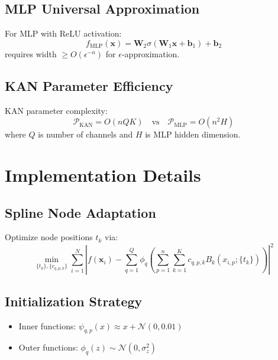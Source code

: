 \documentclass[12pt]{article}
\theoremstyle{plain}
\theoremstyle{definition}
\begin{document}
\subsection{MLP Universal Approximation}
For MLP with ReLU activation:
$$
f_{\text{MLP}}(\mathbf{x}) = \mathbf{W}_2 \sigma(\mathbf{W}_1\mathbf{x} + \mathbf{b}_1) + \mathbf{b}_2
$$
requires width $ \geq O(\epsilon^{-n}) $ for $ \epsilon $-approximation.

\subsection{KAN Parameter Efficiency}
KAN parameter complexity:
$$
\mathcal{P}_{\text{KAN}} = O(nQK) \quad \text{vs} \quad \mathcal{P}_{\text{MLP}} = O(n^2H)
$$
where $ Q $ is number of channels and $ H $ is MLP hidden dimension.

\section{Implementation Details}

\subsection{Spline Node Adaptation}
Optimize node positions $ t_k $ via:
$$
\min_{\{t_k\},\{c_{q,p,k}\}} \sum_{i=1}^N \left| f(\mathbf{x}_i) - \sum_{q=1}^Q \phi_q\left( \sum_{p=1}^n \sum_{k=1}^K c_{q,p,k} B_k(x_{i,p}; \{t_k\}) \right) \right|^2
$$

\subsection{Initialization Strategy}
\begin{itemize}
    \item Inner functions: $ \psi_{q,p}(x) \approx x + \mathcal{N}(0,0.01) $
    \item Outer functions: $ \phi_q(z) \sim \mathcal{N}(0,\sigma_z^2) $
\end{itemize}
\end{document}
